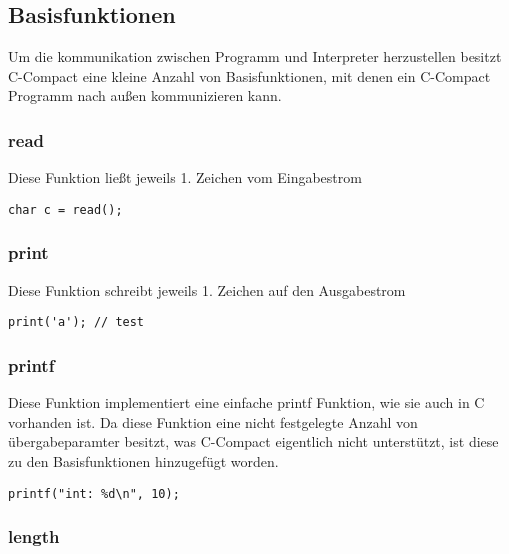 
\subsection{Basisfunktionen}

Um die kommunikation zwischen Programm und Interpreter herzustellen besitzt C-Compact eine kleine Anzahl von Basisfunktionen, mit denen ein C-Compact Programm nach außen kommunizieren kann.

\subsubsection{read}

Diese Funktion ließt jeweils 1. Zeichen vom Eingabestrom

\begin{lstlisting}[language=CMM]
char c = read();
\end{lstlisting}

\subsubsection{print}

Diese Funktion schreibt jeweils 1. Zeichen auf den Ausgabestrom

\begin{lstlisting}[language=CMM]
print('a'); // test
\end{lstlisting}

\subsubsection{printf}

Diese Funktion implementiert eine einfache printf Funktion, wie sie auch in C vorhanden  ist. Da diese Funktion eine nicht festgelegte Anzahl von \"ubergabeparamter besitzt, was C-Compact eigentlich nicht unterst\"utzt, ist diese zu den Basisfunktionen hinzugef\"ugt worden.

\begin{lstlisting}[language=CMM]
printf("int: %d\n", 10);
\end{lstlisting}

\subsubsection{length}

